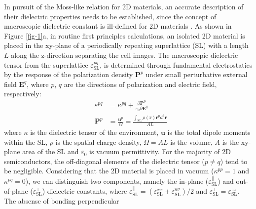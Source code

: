 \documentclass[journal=ancac3,manuscript=article,email=true,hyperref=true,keywords=false]{achemso}
\begin{document}
In pursuit of the Moss-like relation for 2D materials, an accurate
description of their dielectric properties needs to be established,
since the concept of macroscopic dielectric constant is ill-defined
for 2D materials
\cite{Cudazzo_2010_screen2D,Cudazzo_2011_screening_2D,Nazarov_2015_2D_3D}. As
shown in Figure \ref{fig-1}a, in routine first principles
calculations, an isolated 2D material is placed in the xy-plane of a
periodically repeating superlattice (SL) with a length $L$ along the
z-direction separating the cell images. The macroscopic dielectric
tensor from the superlattice $\varepsilon_{\mathrm{SL}}^{pq}$, is
determined through fundamental electrostatics by the response of the
polarization density $\boldsymbol{P}^{p}$ under small perturbative
external field $\boldsymbol{E}^{q}$, where $p$, $q$ are the directions
of polarization and electric field,
respectively\cite{Dressel_2001_electrodynamics}:
\begin{subequations}
  \begin{eqnarray}
      \label{eq:def-eps-1}
    &\varepsilon^{pq} &= \kappa^{pq} +
                                 {\displaystyle \frac{\partial \boldsymbol{P}^{p}}
                                 {\varepsilon_{0} \partial \boldsymbol{E}^{q}}} \\
          \label{eq:def-eps-2}
    &\boldsymbol{P}^{p} &=  {\displaystyle \frac{\boldsymbol{u}^{p}}{\Omega}}
                          = {\displaystyle \frac{{\displaystyle
          \int_{\mathrm{SL}} \rho(\boldsymbol{r}) \boldsymbol{r}^{p} d^{3}\boldsymbol{r}}}
                          {AL}}
  \end{eqnarray}
\end{subequations}
where $\kappa$ is the dielectric tensor of the environment,
$\boldsymbol{u}$ is the total dipole moments within the SL, $\rho$ is the
spatial charge density, $\Omega=AL$ is the volume, $A$ is the xy-plane
area of the SL and $\varepsilon_{0}$ is vacuum permittivity. For the
majority of 2D semiconductors, the off-diagonal elements of the
dielectric tensor ($p \neq q$) tend to be negligible.  Considering
that the 2D material is placed in vacuum ($\kappa^{pp} = 1$ and
$\kappa^{pq} = 0$), we can distinguish two components, namely the
in-plane ($\varepsilon_{\mathrm{SL}}^{\parallel}$) and out-of-plane
($\varepsilon_{\mathrm{SL}}^{\perp}$) dielectric constants, where
$\varepsilon_{\mathrm{SL}}^{\parallel} =
(\varepsilon_{\mathrm{SL}}^{xx} + \varepsilon_{\mathrm{SL}}^{yy})/2$
and
$\varepsilon_{\mathrm{SL}}^{\perp} =
\varepsilon_{\mathrm{SL}}^{zz}$. The absense of bonding perpendicular
\end{document}
